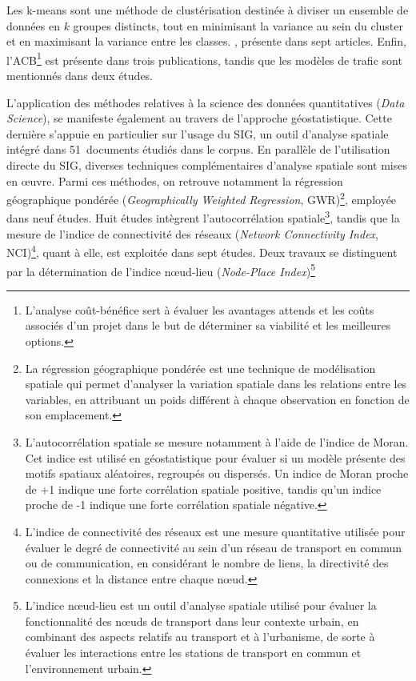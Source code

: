 \begin{refsegment}
{    Les k-means sont une méthode de clustérisation destinée à diviser un ensemble de données en $ k $ groupes distincts, tout en minimisant la variance au sein du cluster et en maximisant la variance entre les classes.
}, présente dans sept articles. Enfin, l'\acrfull{ACB}\footnote{
    L'analyse coût-bénéfice sert à évaluer les avantages attends et les coûts associés d'un projet dans le but de déterminer sa viabilité et les meilleures options.
} est présente dans trois publications, tandis que les modèles de trafic sont mentionnés dans deux études.%
    
L'application des méthodes relatives à la science des données quantitatives (\textsl{Data Science}), se manifeste également au travers de l'approche géostatistique. Cette dernière s'appuie en particulier sur l'usage du \acrshort{SIG}, un outil d'analyse spatiale intégré dans 51~documents étudiés dans le corpus. En parallèle de l'utilisation directe du \acrshort{SIG}, diverses techniques complémentaires d'analyse spatiale sont mises en œuvre. Parmi ces méthodes, on retrouve notamment la régression géographique pondérée (\textsl{Geographically Weighted Regression}, GWR)\footnote{
    La régression géographique pondérée est une technique de modélisation spatiale qui permet d'analyser la variation spatiale dans les relations entre les variables, en attribuant un poids différent à chaque observation en fonction de son emplacement.
}, employée dans neuf études. Huit études intègrent l'autocorrélation spatiale\footnote{
    L'autocorrélation spatiale se mesure notamment à l'aide de l'indice de Moran. Cet indice est utilisé en géostatistique pour évaluer si un modèle présente des motifs spatiaux aléatoires, regroupés ou dispersés. Un indice de Moran proche de +1 indique une forte corrélation spatiale positive, tandis qu'un indice proche de -1 indique une forte corrélation spatiale négative.
}, tandis que la mesure de l'indice de connectivité des réseaux (\textsl{Network Connectivity Index}, NCI)\footnote{
    L'indice de connectivité des réseaux est une mesure quantitative utilisée pour évaluer le degré de connectivité au sein d'un réseau de transport en commun ou de communication, en considérant le nombre de liens, la directivité des connexions et la distance entre chaque nœud.
}, quant à elle, est exploitée dans sept études. Deux travaux se distinguent par la détermination de l'indice nœud-lieu (\textsl{Node-Place Index})\footnote{
    L'indice nœud-lieu est un outil d'analyse spatiale utilisé pour évaluer la fonctionnalité des nœuds de transport dans leur contexte urbain, en combinant des aspects relatifs au transport et à l'urbanisme, de sorte à évaluer les interactions entre les stations de transport en commun et l'environnement urbain.
}
\end{refsegment}
